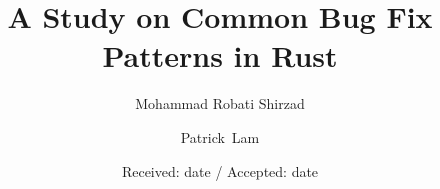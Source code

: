 \documentclass[smallextended]{svjour3}       %
\begin{document}
\title{A Study on Common Bug Fix Patterns in Rust%
}
\subtitle{}


\author{Mohammad Robati Shirzad         \and
        Patrick~Lam %
}



\date{Received: date / Accepted: date}


\maketitle
\end{document}
